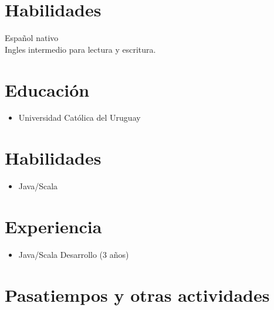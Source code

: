 \section*{Habilidades}
Español nativo \\
Ingles intermedio para lectura y escritura.
\section*{Educación}
\begin{itemize}
\item Universidad Católica del Uruguay
\end{itemize}

\section*{Habilidades}
\begin{itemize}
\item Java/Scala
\end{itemize}

\section*{Experiencia}
\begin{itemize}
\item Java/Scala Desarrollo (3 años)
\end{itemize}

\section*{Pasatiempos y otras actividades}